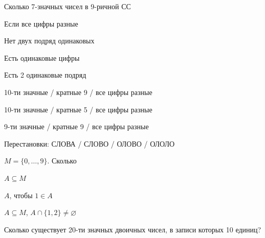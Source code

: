 \documentclass[a4paper,12pt,oneside]{article}
\begin{document}

\begin{numlist}
  \item Сколько 7-значных чисел в 9-ричной СС
  \item Если все цифры разные
  \item Нет двух подряд одинаковых
  \item Есть одинаковые цифры
  \item Есть 2 одинаковые подряд
\end{numlist}

\begin{numlist}
  \item 10-ти значные / кратные 9 / все цифры разные
  \item 10-ти значные / кратные 5 / все цифры разные
  \item 9-ти значные / кратные 9 / все цифры разные
\end{numlist}

Перестановки: СЛОВА / СЛОВО / ОЛОВО / ОЛОЛО

$M=\{0,\ldots,9\}$. Сколько
\begin{numlist}
  \item $A\subseteq M$
  \item $A$, чтобы $1\in A$
  \item $A\subseteq M$, $A\cap\{1,2\}\ne\varnothing$
\end{numlist}

Сколько существует 20-ти значных двоичных чисел, в записи которых 10 единиц?
\end{document}
